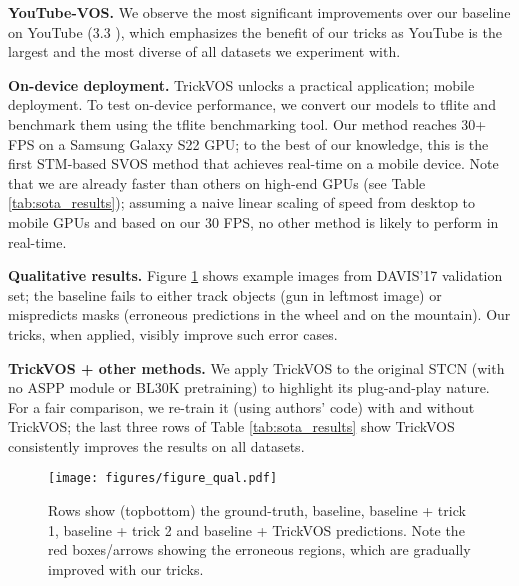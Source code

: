 \noindent \textbf{YouTube-VOS.} We observe the most significant improvements over our baseline on YouTube (3.3 ), which emphasizes the benefit of our tricks as YouTube is the largest and the most diverse of all datasets we experiment with. 

\noindent \textbf{On-device deployment.} TrickVOS unlocks a practical application; mobile deployment. To test on-device performance, we convert our models to tflite and benchmark them using the tflite benchmarking tool. Our method reaches 30+ FPS on a Samsung Galaxy S22 GPU; to the best of our knowledge, this is the first STM-based SVOS method that achieves real-time on a mobile device. Note that we are already faster than others on high-end GPUs (see Table \ref{tab:sota_results}); assuming a naive linear scaling of speed from desktop to mobile GPUs and based on our 30 FPS, no other method is likely to perform in real-time.


\noindent \textbf{Qualitative results.} Figure \ref{fig:qual} shows example images from DAVIS'17 validation set; the baseline fails to either track objects (gun in leftmost image) or mispredicts masks (erroneous predictions in the wheel and on the mountain). Our tricks, when applied, visibly improve such error cases.

\noindent \textbf{TrickVOS + other methods.} We apply TrickVOS to the original STCN (with no ASPP module or BL30K pretraining) to highlight its plug-and-play nature. For a fair comparison, we re-train it (using authors' code) with and without TrickVOS; the last three rows of Table \ref{tab:sota_results} show TrickVOS consistently improves the results on all datasets. 




\begin{figure}[!t]
  \centering
        \texttt{[image: figures/figure\_qual.pdf]}
  \vspace{-7mm}
  \caption{Rows show (topbottom) the ground-truth, baseline, baseline + trick 1, baseline + trick 2 and baseline + TrickVOS predictions. Note the red boxes/arrows showing the erroneous regions, which are gradually improved with our tricks. } 
  \vspace{1mm}
  \label{fig:qual}
\end{figure}


\vspace{-5mm}




